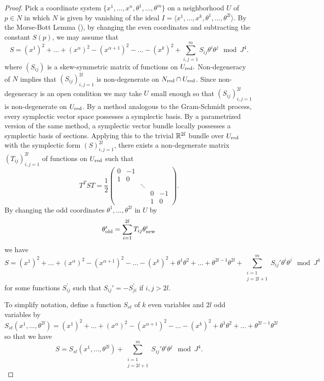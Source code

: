 \documentclass[11pt]{amsart}
\numberwithin{equation}{section}
\numberwithin{figure}{section}
\theoremstyle{plain}
\theoremstyle{definition}
\theoremstyle{remark}
\begin{document}
\begin{proof}
Pick a coordinate system $\{x^{1},\dots,x^{n},\theta^{1},\dots,\theta^{m}\}$
on a neighborhood $U$ of $p\in N$ in which $N$ is given by vanishing
of the ideal $I=\langle x^{1},\dots,x^{k},\theta^{1},\dots,\theta^{2l}\rangle$.
By the Morse-Bott Lemma (), by changing the even
coordinates and subtracting the constant $S(p)$, we may assume that
\[
S=\left(x^{1}\right)^{2}+\dots+\left(x^{\alpha}\right)^{2}-\left(x^{\alpha+1}\right)^{2}-\dots-\left(x^{k}\right)^{2}+\sum_{i,j=1}^{m}S_{ij}\theta^{i}\theta^{j}\mod J^{4}.
\]
where $(S_{ij})$ is a skew-symmetric matrix of functions on $U_{\mathrm{red}}.$
Non-degeneracy of $N$ implies that $(S_{ij})_{i,j=1}^{2l}$ is non-degenerate
on $N_{\mathrm{red}}\cap U_{\mathrm{red}}$. Since non-degeneracy is an open condition
we may take $U$ small enough so that $(S_{ij})_{i,j=1}^{2l}$ is
non-degenerate on $U_{\mathrm{red}}$. By a method analogous to the Gram-Schmidt
process, every symplectic vector space possesses a symplectic basis.
By a parametrized version of the same method, a symplectic vector
bundle locally possesses a symplectic basis of sections. Applying
this to the trivial $\mathbb{R}^{2l}$ bundle over $U_{\mathrm{red}}$ with the symplectic
form $(S)_{i,j=1}^{2l}$, there exists a non-degenerate matrix $(T_{ij})_{i,j=1}^{2l}$
of functions on $U_{\mathrm{red}}$ such that 
\[
T^{T}ST=\frac{1}{2}\left(\begin{matrix}0 & -1\\
1 & 0\\
 &  & \ddots\\
 &  &  & 0 & -1\\
 &  &  & 1 & 0
\end{matrix}\right).
\]
By changing the odd coordinates $\theta^{1},\dots,\theta^{2l}$ in
$U$ by 
\[
\theta_{{\rm old}}^{i}=\sum_{i=1}^{2l}T_{ij}\theta_{{\rm new}}^{i}
\]
we have 
\[
S=\left(x^{1}\right)^{2}+\dots+\left(x^{\alpha}\right)^{2}-\left(x^{\alpha+1}\right)^{2}-\dots-\left(x^{k}\right)^{2}+\theta^{1}\theta^{2}+\dots+\theta^{2l-1}\theta^{2l}+\sum_{\substack{i=1\\
j=2l+1
}
}^{m}S_{ij}'\theta^{i}\theta^{j}\mod J^{4}
\]
for some functions $S_{ij}^{'}$ such that $S_{ij}'=-S_{ji}^{'}$
if $i,j>2l$.

To simplify notation, define a function $S_{st}$ of $k$ even variables
and $2l$ odd variables by 
\[
S_{st}(x^{1},\dots,\theta^{2l})=\left(x^{1}\right)^{2}+\dots+\left(x^{\alpha}\right)^{2}-\left(x^{\alpha+1}\right)^{2}-\dots-\left(x^{k}\right)^{2}+\theta^{1}\theta^{2}+\dots+\theta^{2l-1}\theta^{2l}
\]
so that we have 
\begin{equation}
S=S_{st}(x^{1},\dots,\theta^{2l})+\sum_{\substack{i=1\\
j=2l+1
}
}^{m}S_{ij}'\theta^{i}\theta^{j}\mod J^{4}.\label{eq:S=00003DS_st+...}
\end{equation}



\end{proof}
\end{document}
